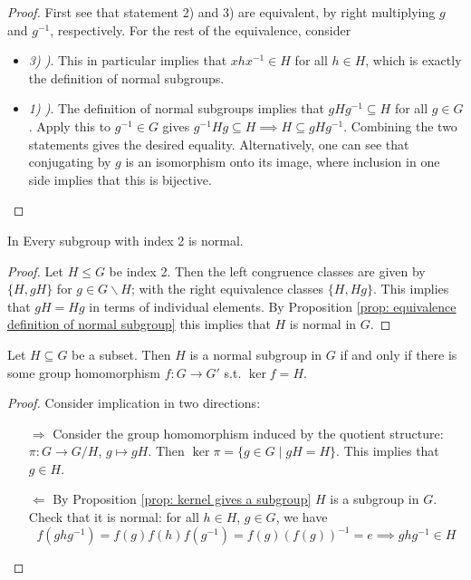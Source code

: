 \documentclass{article}
\begin{document}
\begin{proof}
    First see that statement 2) and 3) are equivalent, by right multiplying $g$ and $g^{-1}$, respectively. For the rest of the equivalence, consider
    \begin{itemize}
        \item \emph{3) )}. This in particular implies that $xhx^{-1} \in H$ for all $h \in H$, which is exactly the definition of normal subgroups.
        \item \emph{1) )}. The definition of normal subgroups implies that $gHg^{-1} \subseteq H$ for all $g \in G$. Apply this to $g^{-1} \in G$ gives $g^{-1} H g \subseteq H \implies H \subseteq gHg^{-1}$. Combining the two statements gives the desired equality. Alternatively, one can see that conjugating by $g$ is an isomorphism onto its image, where inclusion in one side implies that this is bijective. 
    \end{itemize}
\end{proof}

\begin{corollary}
    In Every subgroup with index 2 is normal.
\end{corollary}

\begin{proof}
    Let $H \leq G$ be index 2. Then the left congruence classes are given by $\{ H, gH \}$ for $g \in G \smallsetminus H$; with the right equivalence classes $\{ H, Hg \}$. This implies that $gH = Hg$ in terms of individual elements. By Proposition \ref{prop: equivalence definition of normal subgroup} this implies that $H$ is normal in $G$. 
\end{proof}

\begin{proposition}\label{prop: kernel gives a normal subgroup}
    Let $H \subseteq G$ be a subset. Then $H$ is a normal subgroup in $G$ if and only if there is some group homomorphism $f: G \to G'$ s.t. $\ker f = H$.
\end{proposition}

\begin{proof}
    Consider implication in two directions:
    \begin{enumerate}
        \item[$\Rightarrow$] Consider the group homomorphism induced by the quotient structure: $\pi: G \to G/H$, $g \mapsto gH$. Then $\ker \pi = \{ g \in G \mid gH = H \}$. This implies that $g \in H$.
        \item[$\Leftarrow$] By Proposition \ref{prop: kernel gives a subgroup} $H$ is a subgroup in $G$. Check that it is normal: for all $h \in H$, $g \in G$, we have
        \[
            f(ghg^{-1}) = f(g) f(h) f(g^{-1}) = f(g) (f(g))^{-1} = e \implies ghg^{-1} \in H
        \]
    \end{enumerate}
\end{proof}
\end{document}
